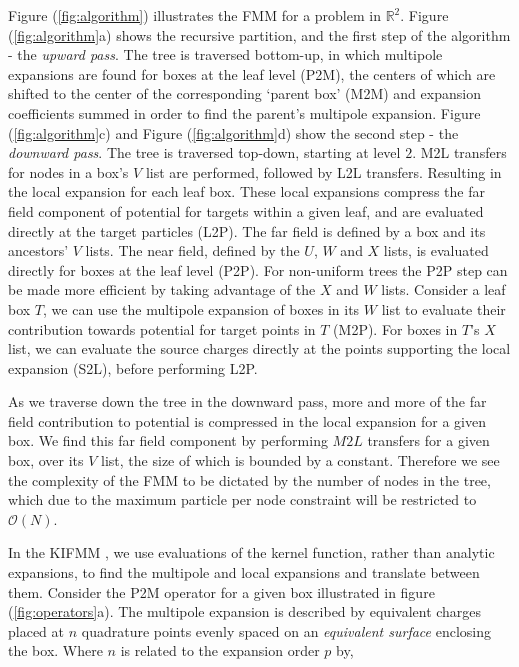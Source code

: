 \documentclass{IEEEcsmag}
\begin{document}
Figure (\ref{fig:algorithm}) illustrates the FMM for a problem in $\mathbb{R}^2$. Figure (\ref{fig:algorithm}a) shows the recursive partition, and the first step of the algorithm - the \textit{upward pass}. The tree is traversed bottom-up, in which multipole expansions are found for boxes at the leaf level (P2M), the centers of which are shifted to the center of the corresponding `parent box' (M2M) and expansion coefficients summed in order to find the parent's multipole expansion. Figure (\ref{fig:algorithm}c) and Figure (\ref{fig:algorithm}d) show the second step - the \textit{downward pass}. The tree is traversed top-down, starting at level $2$. M2L transfers for nodes in a box's $V$ list are performed, followed by L2L transfers. Resulting in the local expansion for each leaf box. These local expansions compress the far field component of potential for targets within a given leaf, and are evaluated directly at the target particles (L2P). The far field is defined by a box and its ancestors' $V$ lists. The near field, defined by the $U$, $W$ and $X$ lists, is evaluated directly for boxes at the leaf level (P2P). For non-uniform trees the P2P step can be made more efficient by taking advantage of the $X$ and $W$ lists. Consider a leaf box $T$, we can use the multipole expansion of boxes in its $W$ list to evaluate their contribution towards potential for target points in $T$ (M2P). For boxes in $T$'s $X$ list, we can evaluate the source charges directly at the points supporting the local expansion (S2L), before performing L2P.

As we traverse down the tree in the downward pass, more and more of the far field contribution to potential is compressed in the local expansion for a given box. We find this far field component by performing $M2L$ transfers for a given box, over its $V$ list, the size of which is bounded by a constant. Therefore we see the complexity of the FMM to be dictated by the number of nodes in the tree, which due to the maximum particle per node constraint will be restricted to $\mathcal{O}(N)$.

In the KIFMM \cite{Ying2004}, we use evaluations of the kernel function, rather than analytic expansions, to find the multipole and local expansions and translate between them. Consider the P2M operator for a given box illustrated in figure (\ref{fig:operators}a). The multipole expansion is described by equivalent charges placed at $n$ quadrature points evenly spaced on an \textit{equivalent surface} enclosing the box. Where $n$ is related to the expansion order $p$ by,
\end{document}
